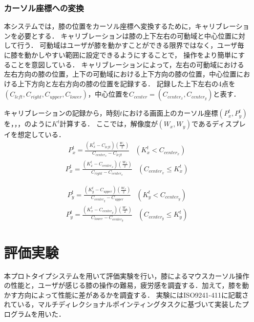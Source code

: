 \documentclass[submit, techrep]{ipsj}
\begin{document}
\subsubsection{カーソル座標への変換}
本システムでは，膝の位置をカーソル座標へ変換するために，キャリブレーションを必要とする．
キャリブレーションは膝の上下左右の可動域と中心位置に対して行う．
可動域はユーザが膝を動かすことができる限界ではなく，ユーザ毎に膝を動かしやすい範囲に設定できるようにすることで，
操作をより簡単にすることを意図している．
キャリブレーションによって，左右の可動域における左右方向の膝の位置，上下の可動域における上下方向の膝の位置，中心位置における上下方向と左右方向の膝の位置を記録する．
記録した上下左右の4点を$(C_{left},C_{right},C_{upper},C_{lower})$，中心位置を$C_{center}=(C_{center_x},  C_{center_y})$と表す．\par
キャリブレーションの記録から，時刻$t$における画面上のカーソル座標$(P^t_x, P^t_y)$を，，，のように$K^t$計算する．
ここでは，解像度が$(W_x, W_y)$であるディスプレイを想定している．
\begin{eqnarray}
	\label{eq:calc_px1}
	P^t_x = 
		\frac{(K^t_x - C_{left}) \left( \frac{W_x}{2} \right)}{C_{center_x} - C_{left}} & (K^t_x < C_{center_x})
\end{eqnarray}
\begin{eqnarray}
	\label{eq:calc_px2}
	P^t_x = 
		\frac{(K^t_x - C_{center_x}) \left( \frac{W_x}{2} \right)}{C_{right} - C_{center_x}} & (C_{center_x} \leq K^t_x) 
\end{eqnarray}

\begin{eqnarray}
	\label{eq:calc_py1}
	P^t_y = 
		\frac{(K^t_y - C_{upper}) \left( \frac{W_x}{2} \right)}{C_{center_y} - C_{upper}} & (K^t_y < C_{center_y}) 
\end{eqnarray}
\begin{eqnarray}
	\label{eq:calc_py2}
	P^t_y = 
		\frac{(K^t_x - C_{center_y}) \left( \frac{W_x}{2} \right)}{C_{lower} - C_{center_y}} & (C_{center_y} \leq K^t_y)
\end{eqnarray}
\section{評価実験}
本プロトタイプシステムを用いて評価実験を行い，膝によるマウスカーソル操作の性能と，ユーザが感じる膝の操作の難易，疲労感を調査する．加えて，膝を動かす方向によって性能に差があるかを調査する．
実験にはISO9241-411\cite{9241411}に記載されている，マルチディレクショナルポインティングタスクに基づいて実装したプログラムを用いた．
\end{document}
